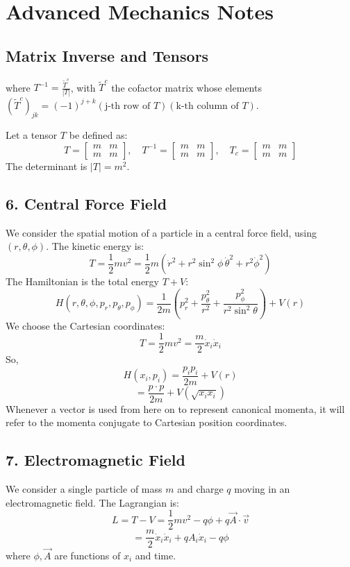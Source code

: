 \documentclass[12pt]{article}
\begin{document}
	\section*{Advanced Mechanics Notes}
	
	\subsection*{Matrix Inverse and Tensors}
	where $T^{-1} = \frac{\tilde{T}^c}{|T|}$, with $\tilde{T}^c$ the cofactor matrix whose elements $(\tilde{T}^c)_{jk} = (-1)^{j+k} (\text{j-th row of } T) (\text{k-th column of } T)$.
	
	Let a tensor $T$ be defined as:
	\[ T = \begin{bmatrix} m & m \\ m & m \end{bmatrix}, \quad T^{-1} = \begin{bmatrix} m & m \\ m & m \end{bmatrix}, \quad T_c = \begin{bmatrix} m & m \\ m & m \end{bmatrix} \]
	The determinant is $|T| = m^2$.
	
	\subsection*{6. Central Force Field}
	We consider the spatial motion of a particle in a central force field, using $(r, \theta, \phi)$.
	The kinetic energy is:
	\[ T = \frac{1}{2} m v^2 = \frac{1}{2} m (\dot{r}^2 + r^2 \sin^2\phi \, \dot{\theta}^2 + r^2 \dot{\phi}^2) \]
	The Hamiltonian is the total energy $T+V$:
	\[ H(r, \theta, \phi, p_r, p_\theta, p_\phi) = \frac{1}{2m} (p_r^2 + \frac{p_\theta^2}{r^2} + \frac{p_\phi^2}{r^2 \sin^2\theta}) + V(r) \]
	We choose the Cartesian coordinates:
	\[ T = \frac{1}{2} m v^2 = \frac{m}{2} \dot{x}_i \dot{x}_i \]
	So,
	\[ H(x_i, p_i) = \frac{p_i p_i}{2m} + V(r) \]
	\[ = \frac{p \cdot p}{2m} + V(\sqrt{x_i x_i}) \]
	Whenever a vector is used from here on to represent canonical momenta, it will refer to the momenta conjugate to Cartesian position coordinates.
	
	\subsection*{7. Electromagnetic Field}
	We consider a single particle of mass $m$ and charge $q$ moving in an electromagnetic field.
	The Lagrangian is:
	\[ L = T - V = \frac{1}{2} m v^2 - q\phi + q\vec{A} \cdot \vec{v} \]
	\[ = \frac{m}{2} \dot{x}_i \dot{x}_i + q A_i \dot{x}_i - q\phi \]
	where $\phi, \vec{A}$ are functions of $x_i$ and time.
	
\end{document}
